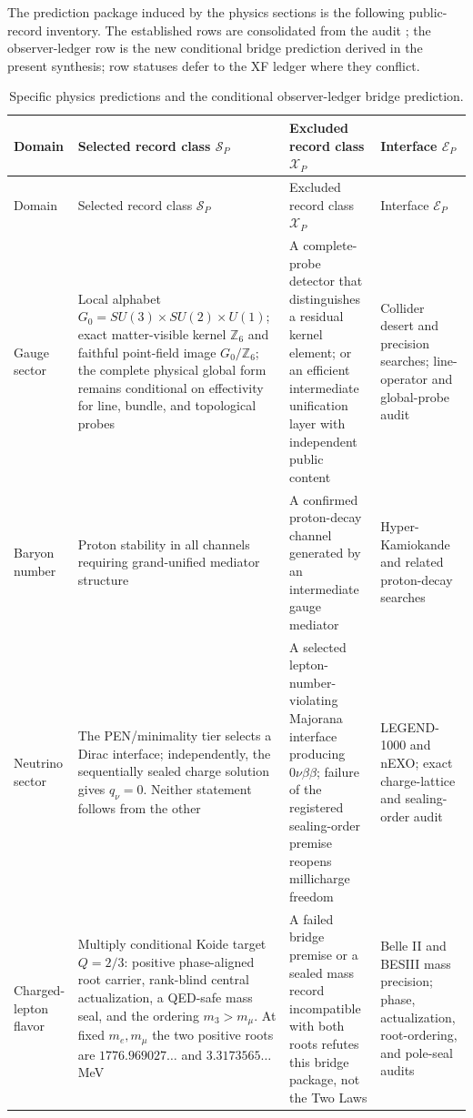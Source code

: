 \documentclass[11pt]{article}
\theoremstyle{plain}
\theoremstyle{definition}
\theoremstyle{remark}
\begin{document}
The prediction package induced by the physics sections is the following public-record inventory. The established rows are consolidated from the audit \cite{lande-audit}; the observer-ledger row is the new conditional bridge prediction derived in the present synthesis; row statuses defer to the XF ledger where they conflict.

{\small
\begin{longtable}{@{}>{\raggedright\arraybackslash}p{}>{\raggedright\arraybackslash}p{}>{\raggedright\arraybackslash}p{}>{\raggedright\arraybackslash}p{}@{}}
\caption{Specific physics predictions and the conditional observer-ledger bridge prediction.}
\label{tab:prediction-inventory}\\
\toprule
Domain & Selected record class \(\mathcal{S}_P\) & Excluded record class \(\mathcal{X}_P\) & Interface \(\mathcal{E}_P\) \\
\midrule
\endfirsthead
\toprule
Domain & Selected record class \(\mathcal{S}_P\) & Excluded record class \(\mathcal{X}_P\) & Interface \(\mathcal{E}_P\) \\
\midrule
\endhead
Gauge sector & Local alphabet \(G_0=SU(3)\times SU(2)\times U(1)\); exact matter-visible kernel \(\mathbb Z_6\) and faithful point-field image \(G_0/\mathbb Z_6\); the complete physical global form remains conditional on effectivity for line, bundle, and topological probes & A complete-probe detector that distinguishes a residual kernel element; or an efficient intermediate unification layer with independent public content & Collider desert and precision searches; line-operator and global-probe audit \\
Baryon number & Proton stability in all channels requiring grand-unified mediator structure & A confirmed proton-decay channel generated by an intermediate gauge mediator & Hyper-Kamiokande and related proton-decay searches \\
Neutrino sector & The PEN/minimality tier selects a Dirac interface; independently, the sequentially sealed charge solution gives \(q_\nu=0\). Neither statement follows from the other & A selected lepton-number-violating Majorana interface producing \(0\nu\beta\beta\); failure of the registered sealing-order premise reopens millicharge freedom & LEGEND-1000 and nEXO; exact charge-lattice and sealing-order audit \\
Charged-lepton flavor & Multiply conditional Koide target \(Q=2/3\): positive phase-aligned root carrier, rank-blind central actualization, a QED-safe mass seal, and the ordering \(m_3>m_\mu\). At fixed \(m_e,m_\mu\) the two positive roots are \(1776.969027\ldots\) and \(3.3173565\ldots\) MeV & A failed bridge premise or a sealed mass record incompatible with both roots refutes this bridge package, not the Two Laws & Belle II and BESIII mass precision; phase, actualization, root-ordering, and pole-seal audits \\

\end{longtable}}
\end{document}
